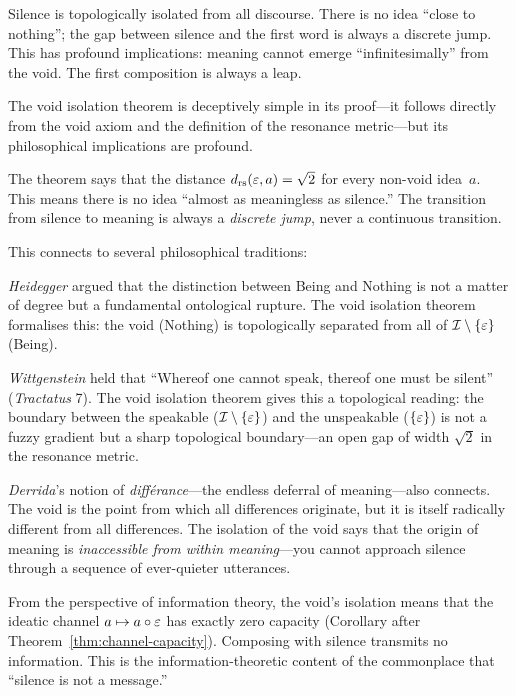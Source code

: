 \begin{interpretation}
Silence is topologically isolated from all discourse.  There is
no idea ``close to nothing''; the gap between silence and the
first word is always a discrete jump.  This has profound
implications: meaning cannot emerge ``infinitesimally'' from the
void.  The first composition is always a leap.
\end{interpretation}

\begin{remark}
The void isolation theorem is deceptively simple in its proof---it
follows directly from the void axiom and the definition of the
resonance metric---but its philosophical implications are profound.

The theorem says that the distance $d_{\mathrm{rs}}(\varepsilon, a) = \sqrt{2}$ for
every non-void idea~$a$.  This means there is no idea ``almost as
meaningless as silence.''  The transition from silence to meaning is
always a \emph{discrete jump}, never a continuous transition.

This connects to several philosophical traditions:

\emph{Heidegger} argued that the distinction between Being and Nothing
is not a matter of degree but a fundamental ontological rupture.  The
void isolation theorem formalises this: the void (Nothing) is
topologically separated from all of $\mathcal{I} \setminus \{\varepsilon\}$ (Being).

\emph{Wittgenstein} held that ``Whereof one cannot speak, thereof one
must be silent'' (\emph{Tractatus} 7).  The void isolation theorem
gives this a topological reading: the boundary between the speakable
($\mathcal{I} \setminus \{\varepsilon\}$) and the unspeakable ($\{\varepsilon\}$) is
not a fuzzy gradient but a sharp topological boundary---an open gap of
width $\sqrt{2}$ in the resonance metric.

\emph{Derrida}'s notion of \emph{diff\'erance}---the endless deferral
of meaning---also connects.  The void is the point from which all
differences originate, but it is itself radically different from all
differences.  The isolation of the void says that the origin of
meaning is \emph{inaccessible from within meaning}---you cannot
approach silence through a sequence of ever-quieter utterances.

From the perspective of information theory, the void's isolation means
that the ideatic channel $a \mapsto a \circ \varepsilon$ has exactly zero
capacity (Corollary after Theorem~\ref{thm:channel-capacity}).
Composing with silence transmits no information.  This is the
information-theoretic content of the commonplace that ``silence is
not a message.''
\end{remark}

